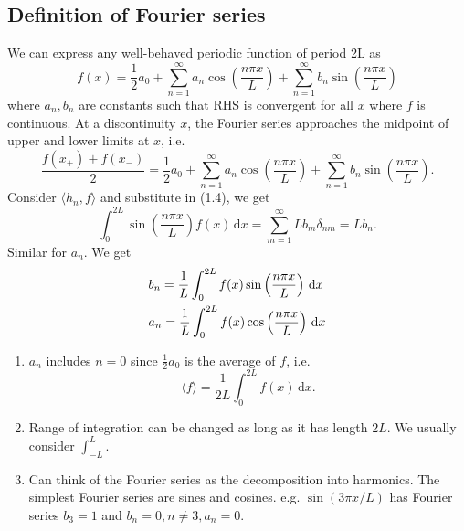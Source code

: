 \documentclass[a4paper]{article}
\begin{document}
\subsection{Definition of Fourier series}
We can express any well-behaved periodic function of period 2L as 
\begin{equation}\label{1.eq.4:FS}
    f(x) = \frac{1}{2}a_0 + \sum_{n=1}^{\infty} a_n \cos \left( \frac{n\pi x}{L} \right)+ \sum_{n=1}^{\infty} b_n \sin \left( \frac{n\pi x}{L} \right)
\end{equation}
where $a_n,b_n$ are constants such that RHS is convergent for all $x$ where $f$ is continuous. At a discontinuity $x$, the Fourier series approaches the midpoint of upper and lower limits at $x$, i.e. 
\[
    \frac{f(x_+)+f(x_-)}{2} = \frac{1}{2}a_0 + \sum_{n=1}^{\infty} a_n \cos \left( \frac{n\pi x}{L} \right)+ \sum_{n=1}^{\infty} b_n \sin \left( \frac{n\pi x}{L} \right).
\]
Consider $ \langle h_n,f \rangle  $ and substitute in (1.4), we get 
\[
    \int_{0}^{2L} \sin \left( \frac{n \pi x}{L} \right) f(x) \,\mathrm{d}x = \sum_{m=1}^{\infty}Lb_m \delta_{nm} = Lb_n.
\]
Similar for $a_n$. We get
\begin{equation}
    \begin{aligned}
        &b_{n}=\frac{1}{L} \int_{0}^{2 L} f(x) \sin \left(\frac{n \pi x}{L}\right)\, \mathrm{d} x\\ &a_n = \frac{1}{L}\int_{0}^{2L} f(x) \cos \left( \frac{n \pi x}{L} \right) \,\mathrm{d}x
    \end{aligned}
\end{equation}
\begin{note}
    \begin{enumerate}
        \item $a_n$ includes $n=0$ since $ \frac{1}{2}a_0 $ is the average of $f$, i.e.
        \[
            \langle f \rangle = \frac{1}{2L}\int_{0}^{2L} f(x) \,\mathrm{d}x.
        \]
        \item Range of integration can be changed as long as it has length $2L$. We usually consider $ \int_{-L}^{L} $.
        \item Can think of the Fourier series as the decomposition into harmonics. The simplest Fourier series are sines and cosines. e.g. $ \sin (3 \pi x/ L) $ has Fourier series $b_3=1$ and $ b_n=0,n\neq 3 ,a_n=0$.
    \end{enumerate}
\end{note}
\end{document}
